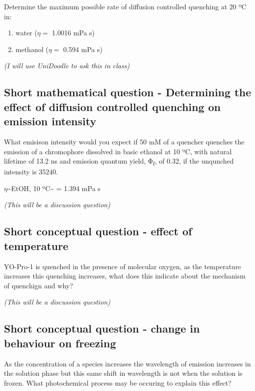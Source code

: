 \documentclass[
]{book}
\providecommand{\tightlist}{%
  \setlength{\itemsep}{0pt}\setlength{\parskip}{0pt}}
\begin{document}
Determine the maximum possible rate of diffusion controlled quenching at 20 ºC in:

\begin{enumerate}
\def\labelenumi{\alph{enumi}.}
\tightlist
\item
  water (\(\eta=\) 1.0016 mPa s)
\item
  methanol (\(\eta=\) 0.594 mPa s)
\end{enumerate}

\emph{(I will use UniDoodle to ask this in class)}

\hypertarget{sec:emintquench}{%
\subsection{Short mathematical question - Determining the effect of diffusion controlled quenching on emission intensity}\label{sec:emintquench}}

What emisison intensity would you expect if 50 mM of a quencher quenches the emission of a chromophore dissolved in basic ethanol at 10 ºC, with natural lifetime of 13.2 ns and emission quantum yield, Φ\textsubscript{f}, of 0.32, if the unqunched intensity is 35240.

\(\eta\)\textasciitilde EtOH, 10 ºC\textasciitilde{} = 1.394 mPa s

\emph{(This will be a discussion question)}

\hypertarget{sec:temp}{%
\subsection{Short conceptual question - effect of temperature}\label{sec:temp}}

YO-Pro-1 is quenched in the presence of molecular oxygen, as the temperature increases this quenching increases, what does this indicate about the mechanism of quenchign and why?

\emph{(This will be a discussion question)}

\hypertarget{short-conceptual-question---change-in-behaviour-on-freezing}{%
\subsection{Short conceptual question - change in behaviour on freezing}\label{short-conceptual-question---change-in-behaviour-on-freezing}}

As the concentration of a species increases the wavelength of emission increases in the solution phase but this same shift in wavelength is not when the solution is frozen. What photochemical process may be occuring to explain this effect?
\end{document}
